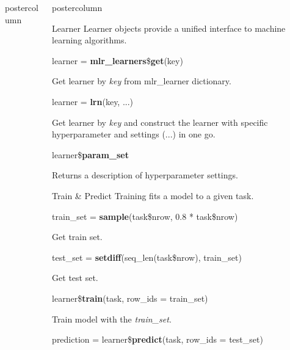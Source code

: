 \documentclass{beamer}
\newlength{\columnheight} %
\begin{document}
\begin{frame}[fragile]{}
\begin{columns}
\begin{column}{.245\textwidth}
\begin{beamercolorbox}[center]{postercolumn}
		\end{beamercolorbox}
	\end{column}
	\begin{column}{.245\textwidth}
		\begin{beamercolorbox}[center]{postercolumn}
			\begin{minipage}{.98\textwidth}
				\parbox[t][\columnheight]{\textwidth}{
					\begin{myblock}{Learner}
						Learner objects provide a unified interface to machine learning algorithms.
						\\
						\begin{codebox}
							learner = \textbf{mlr\_learners}\$\textbf{get}(key)
						\end{codebox}
						 Get learner by \textit{key} from mlr\_learner dictionary.
						\\
						\begin{codebox}
							learner = \textbf{lrn}(key, ...)
						\end{codebox}
						 Get learner by \textit{key} and construct the learner with specific hyperparameter and settings (...) in one go.
						\\
						\begin{codebox}
							learner\$\textbf{param\_set}
						\end{codebox}
						Returns a description of hyperparameter settings.
					\end{myblock}
				\begin{myblock}{Train \& Predict}
					Training fits a model to a given task. 
					\\
					\begin{codebox}
						train\_set = \textbf{sample}(task\$nrow, 0.8 * task\$nrow)
					\end{codebox}
					Get train set.
					\\
					\begin{codebox}
						test\_set = \textbf{setdiff}(seq\_len(task\$nrow), train\_set)
					\end{codebox}
					Get test set.
					\\
					\begin{codebox}
						learner\$\textbf{train}(task, row\_ids = train\_set)
					\end{codebox}
					Train model with the \textit{train\_set}.
					\\
					\begin{codebox}
						prediction = learner\$\textbf{predict}(task, row\_ids = test\_set)
					\end{codebox}

\end{myblock}}
\end{minipage}
\end{beamercolorbox}
\end{column}
\end{columns}
\end{frame}
\end{document}
